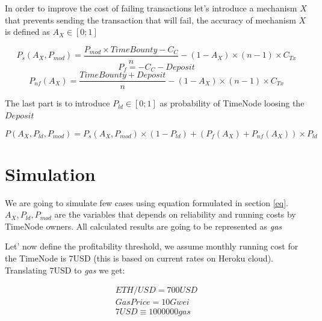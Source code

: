 \documentclass{report}
\begin{document}
\begin{appendices}
  In order to improve the cost of failing transactions let's introduce a mechanism $X$ that prevents sending the transaction that will fail, the accuracy of mechanism $X$ is defined as $A_{X} \in [0;1]$
  
  \[
  P_{s}(A_{X}, P_{mod})=\frac{P_{mod} \times TimeBounty-C_{C}}{n} - (1-A_{X}) \times (n-1) \times C_{Tx}
  \]
  \[
  P_{f}=-C_{C}-Deposit
  \]
  \[
  P_{nf}(A_{X})=\frac{TimeBounty+Deposit}{n} - (1-A_{X}) \times (n-1) \times C_{Tx}
  \]
  
  The last part is to introduce $P_{ld} \in [0;1]$ as probability of TimeNode loosing the $Deposit$
  
  
  \[
  \label{eq}
  P(A_{X}, P_{ld}, P_{mod})=P_{s}(A_{X}, P_{mod}) \times (1-P_{ld}) + (P_{f}(A_{X})+P_{nf}(A_{X})) \times P_{ld}
  \]
  \section{Simulation}
  We are going to simulate few cases using equation formulated in section \ref{eq}. $A_{X}, P_{ld}, P_{mod}$ are the variables that depends on reliability and running costs by TimeNode owners. All calculated results are going to be represented as \textit{gas}
  
  Let' now define the profitability threshold, we assume monthly running cost for the TimeNode is 7USD (this is based on current rates on Heroku cloud). Translating 7USD to \textit{gas} we get:
  
  \begin{align*}
  ETH/USD=700USD\\
  Gas Price = 10Gwei\\
  7USD \equiv 1000000gas
  \end{align*}
  

\end{appendices}
\end{document}

